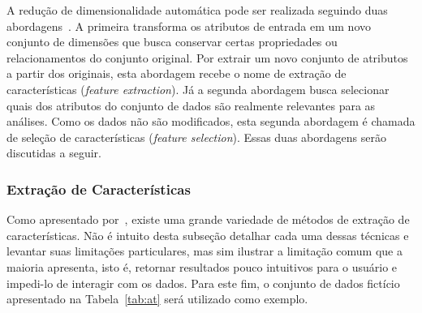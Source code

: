 A redução de dimensionalidade automática pode ser realizada
seguindo duas abordagens~\cite{Pudil1998}. A primeira
transforma os atributos de entrada em um novo conjunto de
dimensões que busca conservar certas propriedades ou
relacionamentos do conjunto original. Por extrair um novo
conjunto de atributos a partir dos originais, esta abordagem
recebe o nome de extração de características (\emph{feature
extraction}). Já a segunda abordagem busca selecionar quais
dos atributos do conjunto de dados são realmente relevantes
para as análises. Como os dados não são
modificados, esta segunda abordagem é chamada de seleção de
características (\emph{feature selection}). Essas duas
abordagens serão discutidas a seguir.

\subsubsection{Extração de Características}

Como apresentado por~\citet{Maaten2009}, existe uma grande
variedade de métodos de extração de características. Não é
intuito desta subseção detalhar cada uma dessas técnicas e
levantar suas limitações particulares, mas sim ilustrar a
limitação comum que a maioria apresenta, isto é, retornar
resultados pouco intuitivos para o usuário e impedi-lo de
interagir com os dados. Para este fim, o conjunto de dados
fictício apresentado na Tabela~\ref{tab:at} será utilizado como
exemplo.

